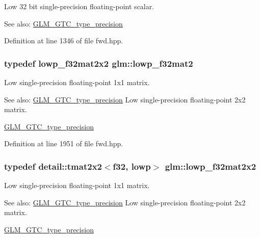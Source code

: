 Low 32 bit single-precision floating-point scalar. \begin{Desc}
\item[See also:]\hyperlink{group__gtc__type__precision}{GLM\_\-GTC\_\-type\_\-precision} \end{Desc}


Definition at line 1346 of file fwd.hpp.\hypertarget{group__gtc__type__precision_gd717448ef1129d7b795ebcfee6c4944c}{
\subsubsection[lowp\_\-f32mat2]{\setlength{\rightskip}{0pt plus 5cm}typedef lowp\_\-f32mat2x2 {\bf glm::lowp\_\-f32mat2}}}
\label{group__gtc__type__precision_gd717448ef1129d7b795ebcfee6c4944c}


Low single-precision floating-point 1x1 matrix. \begin{Desc}
\item[See also:]\hyperlink{group__gtc__type__precision}{GLM\_\-GTC\_\-type\_\-precision} Low single-precision floating-point 2x2 matrix. 

\hyperlink{group__gtc__type__precision}{GLM\_\-GTC\_\-type\_\-precision} \end{Desc}


Definition at line 1951 of file fwd.hpp.\hypertarget{group__gtc__type__precision_ge5beaa9212ba199167c7c7088a70b2bd}{
\subsubsection[lowp\_\-f32mat2x2]{\setlength{\rightskip}{0pt plus 5cm}typedef detail::tmat2x2$<$f32, lowp$>$ {\bf glm::lowp\_\-f32mat2x2}}}
\label{group__gtc__type__precision_ge5beaa9212ba199167c7c7088a70b2bd}


Low single-precision floating-point 1x1 matrix. \begin{Desc}
\item[See also:]\hyperlink{group__gtc__type__precision}{GLM\_\-GTC\_\-type\_\-precision} Low single-precision floating-point 2x2 matrix. 

\hyperlink{group__gtc__type__precision}{GLM\_\-GTC\_\-type\_\-precision} \end{Desc}


